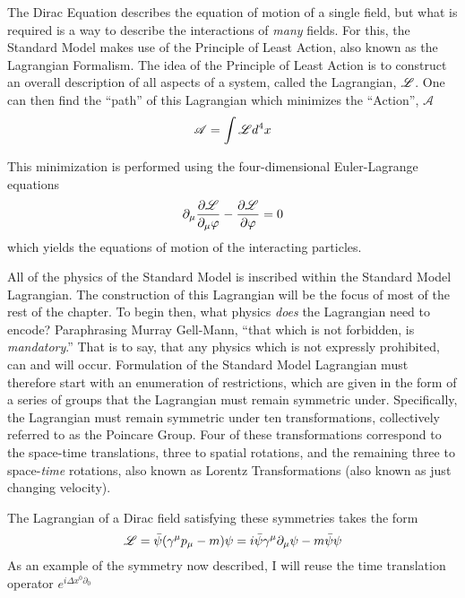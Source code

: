     The Dirac Equation describes the equation of motion of a single field,
        but what is required is a way to describe the interactions of \textit{many} fields.
    For this, the Standard Model makes use of the Principle of Least Action,
        also known as the Lagrangian Formalism\cite{Halzen_book}.
    The idea of the Principle of Least Action is to construct an overall description of all aspects of a system,
        called the Lagrangian, $\mathscr{L}$.
    One can then find the ``path'' of this Lagrangian which minimizes the ``Action'', $\mathscr{A}$
    \begin{equation} %
        \mathscr{A} = \int \Lag d^4 x
    \end{equation}

    This minimization is performed using the four-dimensional Euler-Lagrange equations
    \begin{equation}
        \partial_\mu \frac{\partial \mathscr{L}}{\partial_\mu \varphi } - \frac{\partial \mathscr{L}}{\partial \varphi} = 0
    \end{equation}
    which yields the equations of motion of the interacting particles.

    All of the physics of the Standard Model is inscribed within the Standard Model Lagrangian.
    The construction of this Lagrangian will be the focus of most of the rest of the chapter.
    To begin then, what physics \textit{does} the Lagrangian need to encode?
    Paraphrasing Murray Gell-Mann, ``that which is not forbidden, is \textit{mandatory}\cite{Gell-Mann_mandatory}.''
    That is to say, that any physics which is not expressly prohibited, can and will occur.
    Formulation of the Standard Model Lagrangian must therefore start with an enumeration of restrictions,
        which are given in the form of a series of groups that the Lagrangian must remain symmetric under.
    Specifically, the Lagrangian must remain symmetric under ten transformations,
        collectively referred to as the Poincare Group.
    Four of these transformations correspond to the space-time translations,
        three to spatial rotations, and the remaining three to space-\textit{time} rotations,
        also known as Lorentz Transformations (also known as just changing velocity).

    The Lagrangian of a Dirac field satisfying these symmetries takes the form
    \begin{equation} \label{eq:basic_fermionL}
        \mathscr{L} = \bar{\psi} (\gamma^\mu p_\mu - m) \psi = i \bar{\psi} \gamma^\mu \partial_\mu \psi - m \bar{\psi} \psi
    \end{equation}
    As an example of the symmetry now described, I will reuse the time translation operator $e^{i\Delta x^0 \partial_0}$

